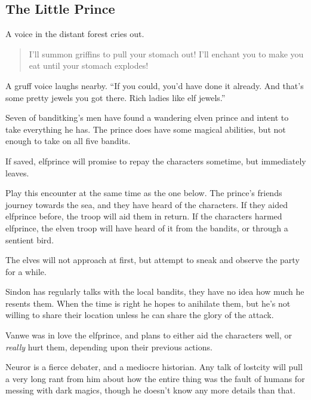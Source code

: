 \begin{multicols}{2}
\subsection{The Little Prince}\label{littleprince}


\begin{boxtext}
	A voice in the distant forest cries out.
	\begin{quote}
		I'll summon griffins to pull your stomach out!  I'll enchant you to make you eat until your stomach explodes!
	\end{quote}

	A gruff voice laughs nearby.  ``If you could, you'd have done it already.  And that's some pretty jewels you got there.  Rich ladies like elf jewels.''

\end{boxtext}

Seven of \gls{banditking}'s men have found a wandering elven prince and intent to take everything he has.  The prince does have some magical abilities, but not enough to take on all five bandits.


\humansoldier


\elf

If saved, \gls{elfprince} will promise to repay the characters sometime, but immediately leaves.


Play this encounter at the same time as the one below.  The prince's friends journey towards the sea, and they have heard of the characters.  If they aided \gls{elfprince} before, the troop will aid them in return.  If the characters harmed \gls{elfprince}, the elven troop will have heard of it from the bandits, or through a sentient bird.

The elves will not approach at first, but attempt to sneak and observe the party for a while.


\elf

Sindon has regularly talks with the local bandits, they have no idea how much he resents them.  When the time is right he hopes to anihilate them, but he's not willing to share their location unless he can share the glory of the attack.

\elf

Vanwe was in love the \gls{elfprince}, and plans to either aid the characters well, or \emph{really} hurt them, depending upon their previous actions.


\label{neuror}

Neuror is a fierce debater, and a mediocre historian.  Any talk of \gls{lostcity} will pull a very long rant from him about how the entire thing was the fault of humans for messing with dark magics, though he doesn't know any more details than that.

\elf

\end{multicols}

